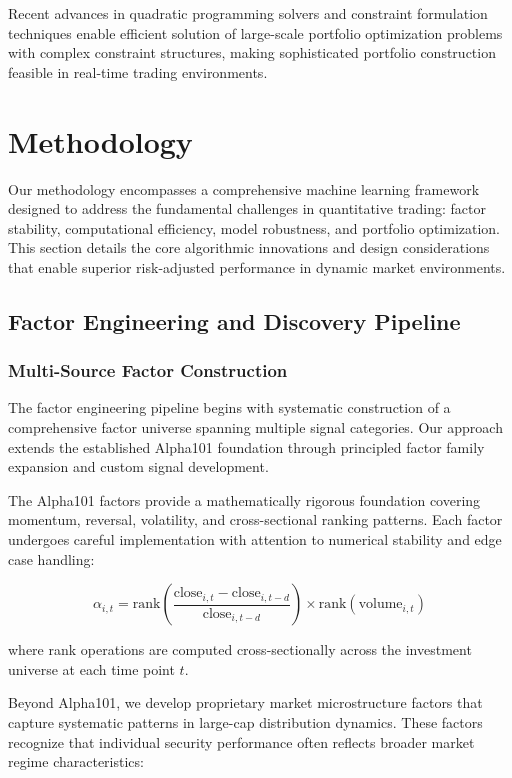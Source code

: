 \documentclass[conference]{IEEEtran}
\begin{document}
Recent advances in quadratic programming solvers and constraint formulation techniques enable efficient solution of large-scale portfolio optimization problems with complex constraint structures, making sophisticated portfolio construction feasible in real-time trading environments.


\section{Methodology}

Our methodology encompasses a comprehensive machine learning framework designed to address the fundamental challenges in quantitative trading: factor stability, computational efficiency, model robustness, and portfolio optimization. This section details the core algorithmic innovations and design considerations that enable superior risk-adjusted performance in dynamic market environments.

\subsection{Factor Engineering and Discovery Pipeline}

\subsubsection{Multi-Source Factor Construction}

The factor engineering pipeline begins with systematic construction of a comprehensive factor universe spanning multiple signal categories. Our approach extends the established Alpha101 foundation through principled factor family expansion and custom signal development.

The Alpha101 factors provide a mathematically rigorous foundation covering momentum, reversal, volatility, and cross-sectional ranking patterns. Each factor undergoes careful implementation with attention to numerical stability and edge case handling:

\begin{equation}
\alpha_{i,t} = \text{rank}\left(\frac{\text{close}_{i,t} - \text{close}_{i,t-d}}{\text{close}_{i,t-d}}\right) \times \text{rank}(\text{volume}_{i,t})
\end{equation}

where rank operations are computed cross-sectionally across the investment universe at each time point $t$.

Beyond Alpha101, we develop proprietary market microstructure factors that capture systematic patterns in large-cap distribution dynamics. These factors recognize that individual security performance often reflects broader market regime characteristics:
\end{document}
